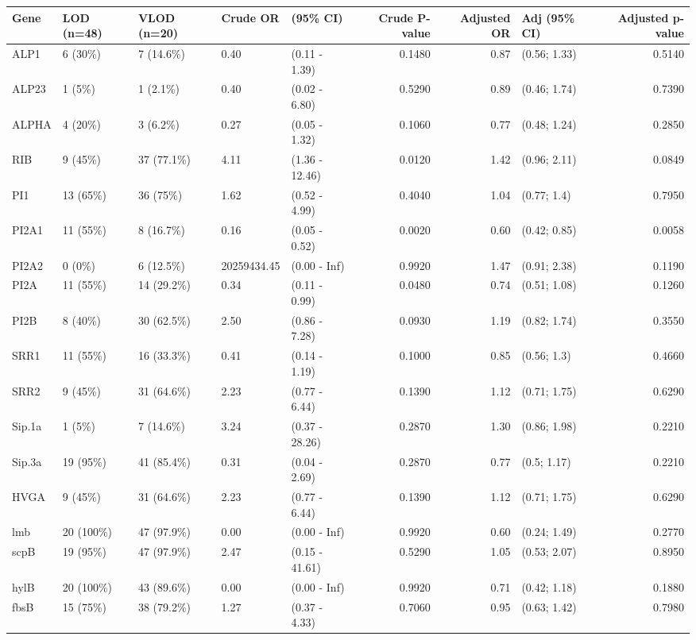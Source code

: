 \begin{table}[ht]
\centering
\begin{tabular}{lllllrrlr}
  \hline
Gene & LOD (n=48) & VLOD (n=20) & Crude OR & (95\% CI) & Crude P-value & Adjusted OR & Adj (95\% CI) & Adjusted p-value \\ 
  \hline
ALP1 & 6 (30\%) & 7 (14.6\%) & 0.40 & (0.11 - 1.39) & 0.1480 & 0.87 & (0.56; 1.33) & 0.5140 \\ 
  ALP23 & 1 (5\%) & 1 (2.1\%) & 0.40 & (0.02 - 6.80) & 0.5290 & 0.89 & (0.46; 1.74) & 0.7390 \\ 
  ALPHA & 4 (20\%) & 3 (6.2\%) & 0.27 & (0.05 - 1.32) & 0.1060 & 0.77 & (0.48; 1.24) & 0.2850 \\ 
  RIB & 9 (45\%) & 37 (77.1\%) & 4.11 & (1.36 - 12.46) & 0.0120 & 1.42 & (0.96; 2.11) & 0.0849 \\ 
  PI1 & 13 (65\%) & 36 (75\%) & 1.62 & (0.52 - 4.99) & 0.4040 & 1.04 & (0.77; 1.4) & 0.7950 \\ 
  PI2A1 & 11 (55\%) & 8 (16.7\%) & 0.16 & (0.05 - 0.52) & 0.0020 & 0.60 & (0.42; 0.85) & 0.0058 \\ 
  PI2A2 & 0 (0\%) & 6 (12.5\%) & 20259434.45 & (0.00 - Inf) & 0.9920 & 1.47 & (0.91; 2.38) & 0.1190 \\ 
  PI2A & 11 (55\%) & 14 (29.2\%) & 0.34 & (0.11 - 0.99) & 0.0480 & 0.74 & (0.51; 1.08) & 0.1260 \\ 
  PI2B & 8 (40\%) & 30 (62.5\%) & 2.50 & (0.86 - 7.28) & 0.0930 & 1.19 & (0.82; 1.74) & 0.3550 \\ 
  SRR1 & 11 (55\%) & 16 (33.3\%) & 0.41 & (0.14 - 1.19) & 0.1000 & 0.85 & (0.56; 1.3) & 0.4660 \\ 
  SRR2 & 9 (45\%) & 31 (64.6\%) & 2.23 & (0.77 - 6.44) & 0.1390 & 1.12 & (0.71; 1.75) & 0.6290 \\ 
  Sip.1a & 1 (5\%) & 7 (14.6\%) & 3.24 & (0.37 - 28.26) & 0.2870 & 1.30 & (0.86; 1.98) & 0.2210 \\ 
  Sip.3a & 19 (95\%) & 41 (85.4\%) & 0.31 & (0.04 - 2.69) & 0.2870 & 0.77 & (0.5; 1.17) & 0.2210 \\ 
  HVGA & 9 (45\%) & 31 (64.6\%) & 2.23 & (0.77 - 6.44) & 0.1390 & 1.12 & (0.71; 1.75) & 0.6290 \\ 
  lmb & 20 (100\%) & 47 (97.9\%) & 0.00 & (0.00 - Inf) & 0.9920 & 0.60 & (0.24; 1.49) & 0.2770 \\ 
  scpB & 19 (95\%) & 47 (97.9\%) & 2.47 & (0.15 - 41.61) & 0.5290 & 1.05 & (0.53; 2.07) & 0.8950 \\ 
  hylB & 20 (100\%) & 43 (89.6\%) & 0.00 & (0.00 - Inf) & 0.9920 & 0.71 & (0.42; 1.18) & 0.1880 \\ 
  fbsB & 15 (75\%) & 38 (79.2\%) & 1.27 & (0.37 - 4.33) & 0.7060 & 0.95 & (0.63; 1.42) & 0.7980 \\ 
   \hline
\end{tabular}
\end{table}
